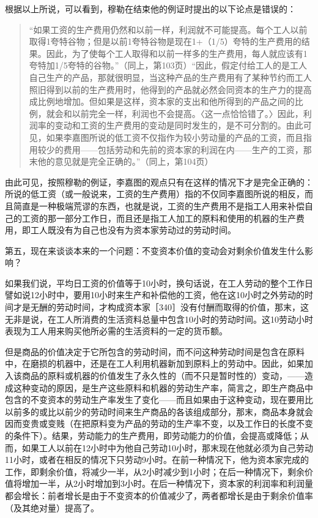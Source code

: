 
根据以上所说，可以看到，穆勒在结束他的例证时提出的以下论点是错误的：

\begin{quote}{“如果工资的生产费用仍然和以前一样，利润就不可能提高。每个工人以前取得1夸特谷物；但是以前1夸特谷物是现在1+（1/5）夸特的生产费用的结果。因此，为了使每个工人取得和以前一样多的生产费用，每人就应该有1夸特加1/5夸特的谷物。”（同上，第103页）“因此，假定付给工人的是工人自己生产的产品，那就很明显，当这种产品的生产费用有了某种节约而工人照旧得到以前的生产费用时，他得到的产品就必然会同资本的生产力的提高成比例地增加。但如果是这样，资本家的支出和他所得到的产品之间的比例，就会和以前完全一样，利润也不会提高。〈这一点恰恰错了。〉因此，利润率的变动和工资的生产费用的变动是同时发生的，是不可分割的。由此可见，如果李嘉图所说的低工资不仅指作为较小劳动量的产品的工资，而且指用较少的费用——包括劳动和先前的资本家的利润在内——生产的工资，那末他的意见就是完全正确的。”（同上，第104页）}\end{quote}

由此可见，按照穆勒的例证，李嘉图的观点只有在这样的情况下才是完全正确的：所说的低工资（或一般说来，工资的生产费用）指的不仅同李嘉图所说的相反，而且简直是一种极端荒谬的东西，也就是说，工资的生产费用不是指工人用来补偿自己的工资的那一部分工作日，而且还是指工人加工的原料和使用的机器的生产费用，即工人既没有为自己也没有为资本家劳动过的劳动时间。


第五，现在来谈谈本来的一个问题：不变资本价值的变动会对剩余价值发生什么影响？

如果我们说，平均日工资的价值等于10小时，换句话说，在工人劳动的整个工作日譬如说12小时中，要用10小时来生产和补偿他的工资，他在这10小时之外劳动的时间才是无酬的劳动时间，才构成资本家［340］没有付酬而取得的价值，那末，这无非是说，在工人所消费的生活资料总量中包含10小时的劳动时间。这10劳动小时表现为工人用来购买他所必需的生活资料的一定的货币额。

但是商品的价值决定于它所包含的劳动时间，而不问这种劳动时间是包含在原料中，在磨损的机器中，还是在工人利用机器新加到原料上的劳动中。因此，如果加入该商品的原料或机器的价值发生了永久性的（而不只是暂时性的）变动，——造成这种变动的原因，是生产这些原料和机器的劳动生产率，简言之，即生产商品中包含的不变资本的劳动生产率发生了变化——而且如果由于这种变动，现在要用比以前多的或比以前少的劳动时间来生产商品的各该组成部分，那末，商品本身就会因而变贵或变贱（在把原料变为产品的劳动的生产率不变，以及工作日的长度不变的条件下）。结果，劳动能力的生产费用，即劳动能力的价值，会提高或降低；从而，如果工人以前在12小时中为他自己劳动10小时，那末现在他就必须为自己劳动11小时，或者在相反的情况下只劳动9小时。在前一种情况下，他为资本家完成的工作，即剩余价值，将减少一半，从2小时减少到1小时；在后一种情况下，剩余价值将增加一半，从2小时增加到3小时。在后一种情况下，资本家的利润率和利润量都会增长：前者增长是由于不变资本的价值减少了，两者都增长是由于剩余价值率（及其绝对量）提高了。

